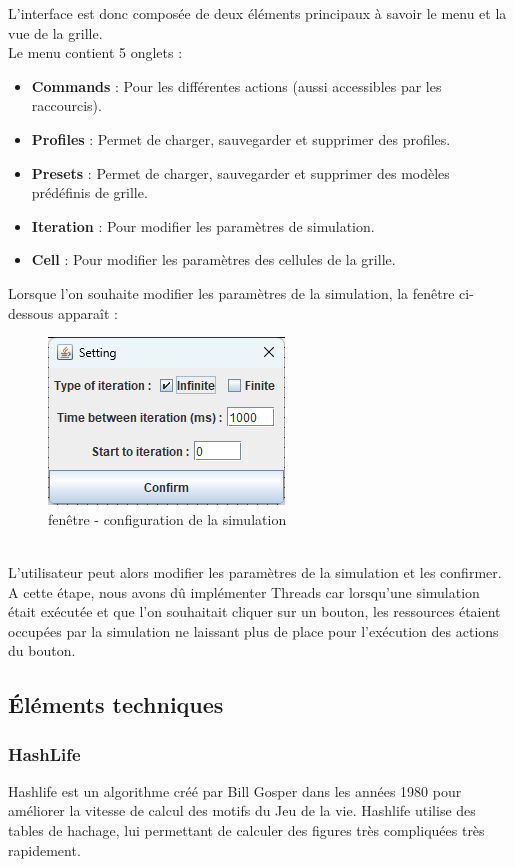 \documentclass[12pt]{article}
\begin{document}
			\newpage
			L'interface est donc composée de deux éléments principaux à savoir le menu et la vue de la grille.\\ 
			Le menu contient 5 onglets : \\
			\begin{itemize}[label= ]
				\item \textbf{Commands} : Pour les différentes actions (aussi accessibles par les raccourcis).
				\item \textbf{Profiles} : Permet de charger, sauvegarder et supprimer des profiles.
				\item \textbf{Presets} : Permet de charger, sauvegarder et supprimer des modèles prédéfinis de grille.
				\item  \textbf{Iteration} : Pour modifier les paramètres de simulation.
				\item \textbf{Cell} : Pour modifier les paramètres des cellules de la grille.
			\end{itemize}
			
			Lorsque l’on souhaite modifier les paramètres de la simulation, la fenêtre ci-dessous apparaît :
			\begin{figure}[!ht]
				\centering
				\includegraphics[width=.5\textwidth]{images/jdialog.png}
				\caption{fenêtre - configuration de la simulation}
			\end{figure}\\
		
			L’utilisateur peut alors modifier les paramètres de la simulation et les confirmer. A cette étape, nous avons dû implémenter Threads car lorsqu’une simulation était exécutée et que l’on souhaitait cliquer sur un bouton, les ressources étaient occupées par la simulation ne laissant plus de place pour l’exécution des actions du bouton.
			
			
			\subsection{Éléments techniques}
			\subsubsection{HashLife} \label{hashlife}
			Hashlife est un algorithme créé par Bill Gosper dans les années 1980 pour améliorer la vitesse de calcul des motifs du Jeu de la vie. Hashlife utilise des tables de hachage, lui permettant de calculer des figures très compliquées très rapidement.
			
\end{document}
